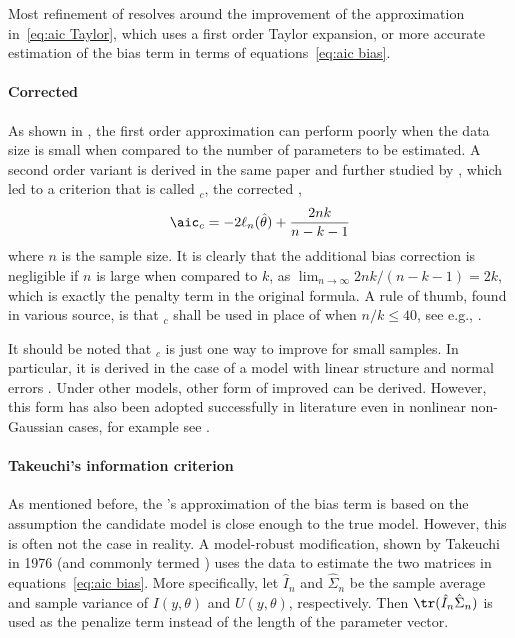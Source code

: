 Most refinement of \aic resolves around the improvement of the approximation
in~\eqref{eq:aic Taylor}, which uses a first order Taylor expansion, or more
accurate estimation of the bias term in terms of equations~\eqref{eq:aic
  bias}.

\paragraph{Corrected \protect\aic}

As shown in \cite{Sugiura:1978be}, the first order approximation can perform
poorly when the data size is small when compared to the number of parameters
to be estimated. A second order variant is derived in the same paper and
further studied by \cite{Hurvich:1989ev}, which led to a criterion that is
called \aic{}$_c$, the corrected \aic,
\begin{equation}
  \aic_c = -2\ell_n(\hat\theta) + \frac{2nk}{n-k-1}
\end{equation}
where $n$ is the sample size. It is clearly that the additional bias
correction is negligible if $n$ is large when compared to $k$, as
$\lim_{n\to\infty}2nk/(n-k-1) = 2k$, which is exactly the penalty term in the
original \aic formula. A rule of thumb, found in various source, is that
\aic{}$_c$ shall be used in place of \aic when $n/k\le40$, see e.g.,
\cite[][sec.~2.4]{Burnham:2002wc}.

It should be noted that \aic{}$_c$ is just one way to improve \aic for small
samples. In particular, it is derived in the case of a model with linear
structure and normal errors \cite{Hurvich:1989ev, Burnham:2002wc}. Under other
models, other form of improved \aic can be derived. However, this form has
also been adopted successfully in literature even in nonlinear non-Gaussian
cases, for example see \cite{Turkheimer:2003iy}.

\paragraph{Takeuchi's information criterion}

As mentioned before, the \aic's approximation of the bias term is based on the
assumption the candidate model is close enough to the true model. However,
this is often not the case in reality. A model-robust modification, shown by
Takeuchi in 1976 (and commonly termed \tic) uses the data to estimate the two
matrices in equations~\eqref{eq:aic bias}. More specifically, let $\hat{I}_n$
and $\hat\Sigma_n$ be the sample average and sample variance of $I(y,\theta)$
and $U(y,\theta)$, respectively. Then $\tr(\hat{I}_n\hat\Sigma_n)$ is used as
the penalize term instead of the length of the parameter vector.

